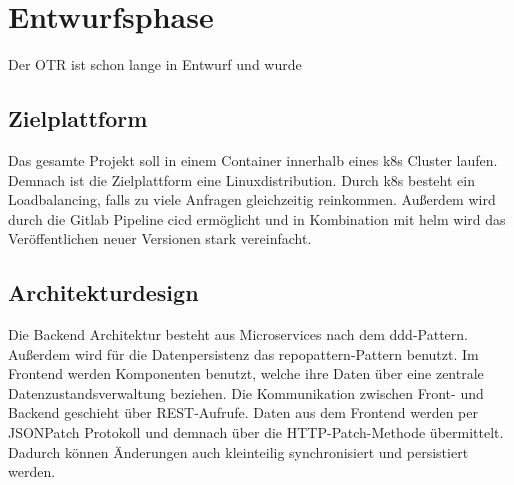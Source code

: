 \newpage
\section{Entwurfsphase}
\label{entwurfsphase}
Der \ac{OTR} ist schon lange in Entwurf und wurde 

\begin{comment}
	Die Kommunikation zwischen Front- und Backend wird durch REST-API Aufrufe realisiert. Um die Daten synchron zu halten wird jede Änderung im Frontend in den \gls{localstorage} des Browsers geschrieben und zeitgleich per HTTP-JSON-PATCH Aufruf ans Backend weitergesendet. Das Backend speichert die neuen oder geänderten Daten im Cache und führt wenn möglich eine Berechnung sowie Validierung durch. Die berechneten Beiträge und Validierungsergebnisse werden anschließend zurückgesendet. Alle Schnittstellen sowie \ac{DTO} werden beim Bauen des Backends automatisch für das Frontend generiert.\\
	Als Versionsverwaltung für dieses Projekt wird \gls{git} mit \gls{gitflow} genutzt. Das \ac{CICD} wird mittels \gls{gitlab} Pipelines realisiert, also eine Möglichkeit automatisch nach jeder Änderung das Projekt zu bauen, zu testen und zu veröffentlichen. Veröffentlicht wird der \ac{OTR} in einem \gls{k8s}-Cluster. Somit muss vorher ein Dockerimage gebaut werden um es dann in einem Container laufen zu lassen. Für jeden Feature-, Develop- und Masterbranch im Git wird jeweils eine eigene Instanz im \gls{k8s} Cluster erstellt, so dass man jeden Stand auf dem Testsystem testen kann.
\end{comment}
\subsection{Zielplattform}
\label{zielplattform}
Das gesamte Projekt soll in einem \gls{Container} innerhalb eines \gls{k8s} Cluster laufen. Demnach ist die Zielplattform eine Linuxdistribution. Durch \gls{k8s} besteht ein Loadbalancing, falls zu viele Anfragen gleichzeitig reinkommen. Außerdem wird durch die Gitlab Pipeline \ac{cicd} ermöglicht und in Kombination mit \gls{helm} wird das Veröffentlichen neuer Versionen stark vereinfacht.
\subsection{Architekturdesign}
\label{architekturdesign}
Die Backend Architektur besteht aus Microservices nach dem \gls{ddd}-Pattern. Außerdem wird für die Datenpersistenz das \gls{repopattern}-Pattern benutzt. Im Frontend werden Komponenten benutzt, welche ihre Daten über eine zentrale Datenzustandsverwaltung beziehen. Die Kommunikation zwischen Front- und Backend geschieht über \gls{REST}-Aufrufe. Daten aus dem Frontend werden per JSONPatch Protokoll und demnach über die HTTP-Patch-Methode übermittelt. Dadurch können Änderungen auch kleinteilig synchronisiert und persistiert werden.
